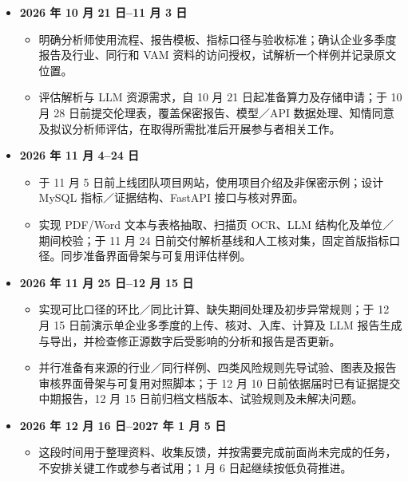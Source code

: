 \documentclass[a4paper,12pt]{article}
\begin{document}
\begin{itemize}
  \item \textbf{2026 年 10 月 21 日--11 月 3 日}
    \begin{itemize}
      \item 明确分析师使用流程、报告模板、指标口径与验收标准；确认企业多季度报告及行业、同行和 VAM 资料的访问授权，试解析一个样例并记录原文位置。
      \item 评估解析与 LLM 资源需求，自 10 月 21 日起准备算力及存储申请；于 10 月 28 日前提交伦理表，覆盖保密报告、模型／API 数据处理、知情同意及拟议分析师评估，在取得所需批准后开展参与者相关工作。
    \end{itemize}

  \item \textbf{2026 年 11 月 4--24 日}
    \begin{itemize}
      \item 于 11 月 5 日前上线团队项目网站，使用项目介绍及非保密示例；设计 MySQL 指标／证据结构、FastAPI 接口与核对界面。
      \item 实现 PDF/Word 文本与表格抽取、扫描页 OCR、LLM 结构化及单位／期间校验；于 11 月 24 日前交付解析基线和人工核对集，固定首版指标口径。同步准备界面骨架与可复用评估样例。
    \end{itemize}

  \item \textbf{2026 年 11 月 25 日--12 月 15 日}
    \begin{itemize}
      \item 实现可比口径的环比／同比计算、缺失期间处理及初步异常规则；于 12 月 15 日前演示单企业多季度的上传、核对、入库、计算及 LLM 报告生成与导出，并检查修正源数字后受影响的分析和报告是否更新。
      \item 并行准备有来源的行业／同行样例、四类风险规则先导试验、图表及报告审核界面骨架与可复用对照脚本；于 12 月 10 日前依据届时已有证据提交中期报告，12 月 15 日前归档文档版本、试验规则及未解决问题。
    \end{itemize}

  \item \textbf{2026 年 12 月 16 日--2027 年 1 月 5 日}
    \begin{itemize}
      \item 这段时间用于整理资料、收集反馈，并按需要完成前面尚未完成的任务，不安排关键工作或参与者试用；1 月 6 日起继续按低负荷推进。
    \end{itemize}


\end{itemize}
\end{document}
